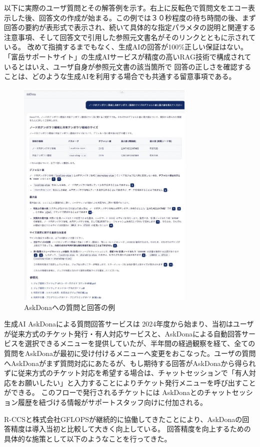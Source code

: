 \documentclass{jsaxiesproc}
\begin{document}
以下に実際のユーザ質問とその解答例を示す。右上に反転色で質問文をエコー表示した後、回答文の作成が始まる。この例では３０秒程度の待ち時間の後、まず回答の要約が表形式で表示され、続いて具体的な指定パラメタの説明と関連する注意事項、そして回答文で引用した参照元文書名がそのリンクとともに示されている。
改めて指摘するまでもなく、生成AIの回答が100\%正しい保証はない。
「富岳サポートサイト」の生成AIサービスが精度の高いRAG技術で構成されているとはいえ、ユーザ自身が参照元文書の該当箇所で
回答の正しさを確認することは、どのような生成AIを利用する場合でも共通する留意事項である。


\begin{figure}[htbp]
\includegraphics[width=8.5cm]{figs/AskDona-Answer.jpg}
\caption{AskDonaへの質問と回答の例}
\label{fig:AskDona-Answer.jpg}
\end{figure}

生成AI AskDonaによる質問回答サービスは 2024年度から始まり、当初はユーザが従来方式のチケット発行・有人対応サービスと、AskDonaによる自動回答サービスを選択できるメニューを提供していたが、半年間の経過観察を経て、全ての質問をAskDonaが最初に受け付けるメニューへ変更をおこなった。ユーザの質問へAskDonaがまず質問対応にあたるが、もし期待する回答がAskDonaから得られずに従来方式のチケット対応を希望する場合は、チャットセッションで「有人対応をお願いしたい」と入力することによりチケット発行メニューを呼び出すことができる。
このフローで発行されるチケットには AskDonaとのチャットセッション履歴を紐づける情報がサポートスタッフ向けに付加される。


R-CCSと株式会社GFLOPSが継続的に協働してきたことにより、AskDonaの回答精度は導入当初と比較して大きく向上している。
回答精度を向上するための具体的な施策として以下のようなことを行ってきた。
\end{document}
